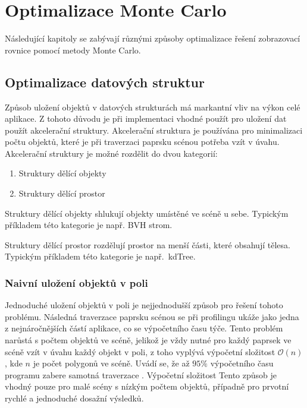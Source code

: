 \documentclass[czech,master]{diploma}
\begin{document}
\clearpage
\chapter{Optimalizace Monte Carlo}\label{sec:reduction}
Následující kapitoly se zabývají různými způsoby optimalizace řešení zobrazovací rovnice pomocí metody Monte Carlo.

\section{Optimalizace datových struktur}
Způsob uložení objektů v datových strukturách má markantní vliv na výkon celé aplikace. Z tohoto důvodu je při implementaci vhodné použít pro uložení dat použít akcelerační struktury. Akcelerační struktura je používána pro minimalizaci počtu objektů, které je při traverzaci paprsku scénou potřeba vzít v úvahu. Akcelerační struktury je možné rozdělit do dvou kategorií:
\begin{enumerate}
  \item Struktury dělící objekty
  \item Struktury dělící prostor
\end{enumerate}
\par
Struktury dělící objekty shlukují objekty umístěné ve scéně u sebe. Typickým příkladem této kategorie je např. BVH strom.\par
Struktury dělící prostor rozdělují prostor na menší části, které obsahují tělesa. Typickým příkladem této kategorie je např.\ kdTree.

\subsection{Naivní uložení objektů v poli}
Jednoduché uložení objektů v poli je nejjednodušší způsob pro řešení tohoto problému. Následná traverzace paprsku scénou se při profilingu ukáže jako jedna z nejnáročnějších částí aplikace, co se výpočetního času týče. Tento problém narůstá s počtem objektů ve scéně, jelikož je vždy nutné pro každý paprsek ve scéně vzít v úvahu každý objekt v poli, z toho vyplývá výpočetní složitost \(\mathcal{O}(n)\), kde \(n\) je počet polygonů ve scéně. Uvádí se, že až \(95\%\) výpočetního času programu zabere samotná traverzace \cite{Meister2018}. Výpočetní složitost Tento způsob je vhodný pouze pro malé scény s nízkým počtem objektů, případně pro prvotní rychlé a jednoduché dosažní výsledků.
\end{document}
